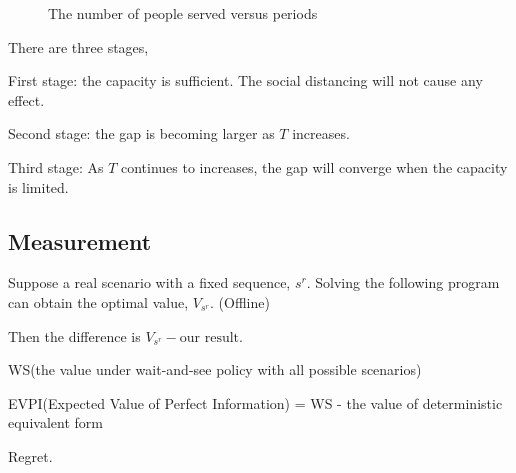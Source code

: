 \begin{figure}[h]
  \centering
  \caption{The number of people served versus periods}
  \label{Fig.lable}
\end{figure}

There are three stages, 

First stage: the capacity is sufficient. The social distancing will not cause any effect.

Second stage: the gap is becoming larger as $T$ increases. 

Third stage: As $T$ continues to increases, the gap will converge when the capacity is limited.


\subsection{Measurement}

Suppose a real scenario with a fixed sequence, $s^{r}$. Solving the following program can obtain the optimal value, $V_{s^{r}}$. (Offline)

Then the difference is $V_{s^{r}} - \text{our result}$.

WS(the value under wait-and-see policy with all possible scenarios)

EVPI(Expected Value of Perfect Information) = WS - the value of deterministic equivalent form

Regret.


\newpage
